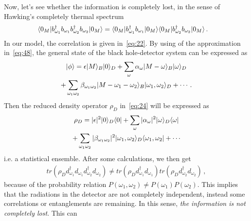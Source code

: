 \documentclass[12pt,a4paper]{article}
\begin{document}
Now, let's see whether the information is completely lost, in the sense
of Hawking's completely thermal spectrum~\cite{j}
\begin{equation}
\label{eq:54}
\begin{split}
\langle0_M\arrowvert
b_{\omega_1}^{\dag}b_{\omega_1}b_{\omega_2}^{\dag}b_{\omega_2}\arrowvert0_M\rangle
&= \langle0_M\arrowvert
b_{\omega_1}^{\dag}b_{\omega_1}\arrowvert0_M\rangle\langle0_M\arrowvert
b_{\omega_2}^{\dag}b_{\omega_2}\arrowvert0_M\rangle \,.
\end{split}
\end{equation}
In our model, the correlation is given in~\eqref{eq:22}. By using of
the approximation in~\eqref{eq:48}, the general state of
the black hole-detector system can be expressed as
\begin{multline}
\label{eq:55}
\arrowvert\phi\rangle = \epsilon\arrowvert
M\rangle_B\arrowvert0\rangle_D+\sum_{\omega}\alpha_{\omega}\arrowvert
M-\omega\rangle_B|\omega\rangle_D\\
+\sum_{\omega_1\omega_2}\beta_{\omega_1\omega_2}\arrowvert
M-\omega_1-\omega_2\rangle_B\arrowvert\omega_1,\omega_2\rangle_D+\cdots
\,.
\end{multline}
Then the reduced density operator $\rho_D$ in~\eqref{eq:24} will be expressed as
\begin{multline}
\label{eq:56}
\rho_D =
|\epsilon|^2\arrowvert0\rangle_D\langle0\arrowvert+\sum_{\omega}|\alpha_{\omega}|^2\arrowvert\omega\rangle_D\langle\omega\arrowvert\\
+\sum_{\omega_1\omega_2}|\beta_{\omega_1\omega_2}|^2\arrowvert\omega_1,\omega_2\rangle_D\langle\omega_1,\omega_2\arrowvert+\cdots
\end{multline}
i.e. a statistical ensemble. After some calculations, we then get
\begin{equation}
\label{eq:57}
\begin{split}
tr(\rho_Dd_{\omega_1}^{\dag}d_{\omega_1}d_{\omega_2}^{\dag}d_{\omega_2})\neq
tr(\rho_Dd_{\omega_1}^{\dag}d_{\omega_1})tr(\rho_Dd_{\omega_2}^{\dag}d_{\omega_2})
\,,
\end{split}
\end{equation}
because of the probability relation $P(\omega_1,\omega_2)\neq
P(\omega_1)P(\omega_2)$. This implies that the radiations in the
detector are not completely independent, instead some correlations or entanglements are remaining. In this sense,
\emph{the information is not completely lost}. This can
\end{document}
